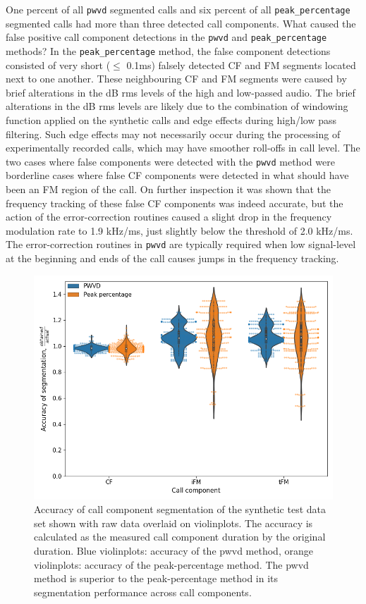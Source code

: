 \documentclass[
]{book}
\begin{document}
One percent of all \texttt{pwvd} segmented calls and six percent of all \texttt{peak\_percentage} segmented calls had more than three detected call components. What caused the false positive call component detections in the \texttt{pwvd} and \texttt{peak\_percentage} methods? In the \texttt{peak\_percentage} method, the false component detections consisted of very short (\(\leq\) 0.1ms) falsely detected CF and FM segments located next to one another. These neighbouring CF and FM segments were caused by brief alterations in the dB rms levels of the high and low-passed audio. The brief alterations in the dB rms levels are likely due to the combination of windowing function applied on the synthetic calls and edge effects during high/low pass filtering. Such edge effects may not necessarily occur during the processing of experimentally recorded calls, which may have smoother roll-offs in call level. The two cases where false components were detected with the \texttt{pwvd} method were borderline cases where false CF components were detected in what should have been an FM region of the call. On further inspection it was shown that the frequency tracking of these false CF components was indeed accurate, but the action of the error-correction routines caused a slight drop in the frequency modulation rate to 1.9 kHz/ms, just slightly below the threshold of 2.0 kHz/ms. The error-correction routines in \texttt{pwvd} are typically required when low signal-level at the beginning and ends of the call causes jumps in the frequency tracking.

\begin{figure}
\includegraphics[width=1\linewidth]{original_papers/itsfm-paper/figures/pwvd-pkpct-comparison} \caption{\label{fig:performance} Accuracy of call component segmentation of the synthetic test data set shown with raw data overlaid on violinplots. The accuracy is calculated as the measured call component duration by the original duration. Blue violinplots: accuracy of the pwvd method, orange violinplots: accuracy of the peak-percentage method. The pwvd method is superior to the peak-percentage method in its segmentation performance across call components.}\label{fig:performance}
\end{figure}
\end{document}
